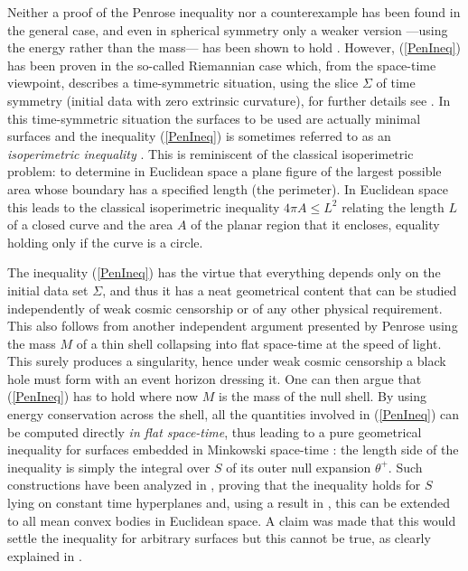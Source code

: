 \documentclass[12pt]{iopart}
\begin{document}
Neither a proof of the Penrose inequality nor a counterexample has been found in the general case, and even in spherical symmetry only a weaker version ---using the energy rather than the mass--- has been shown to hold \cite{Hay1}. However, (\ref{PenIneq}) has been proven in the so-called Riemannian case \cite{Huisken,Bray} which, from the space-time viewpoint, describes a time-symmetric situation, using the slice $\Sigma$ of time symmetry (initial data with zero extrinsic curvature), for further details see \cite{Mars,BrCh}. In this time-symmetric situation the surfaces to be used are actually minimal surfaces and the inequality (\ref{PenIneq}) is sometimes referred to as an {\em isoperimetric inequality} \cite{Gi0,Gi1}. This is reminiscent of the classical isoperimetric problem: to determine in Euclidean space a plane figure of the largest possible area whose boundary has a specified length (the perimeter). In Euclidean space this leads to the classical isoperimetric inequality $4\pi A \le L^2$ relating the length $L$ of a closed curve and the area $A$ of the planar region that it encloses, equality holding only if the curve is a circle. 


The inequality (\ref{PenIneq}) has the virtue that everything depends only on the initial data set $\Sigma$, and thus it has a neat geometrical content that can be studied independently of weak cosmic censorship or of any other physical requirement. This also follows from another independent argument presented by Penrose \cite{PI} using the mass $M$ of a thin shell collapsing into flat space-time at the speed of light. This surely produces a singularity, hence under weak cosmic censorship  a black hole must form with an event horizon dressing it. One can then argue that (\ref{PenIneq}) has to hold where now $M$ is the mass of the null shell. By using energy conservation across the shell, all the quantities involved in (\ref{PenIneq}) can be computed directly {\em in flat space-time}, thus leading to a pure geometrical inequality for surfaces embedded in Minkowski space-time \cite{Gi}: the length side of the inequality is simply the integral over $S$ of its outer null expansion $\theta^{+}$. Such constructions have been analyzed in \cite{Gi,PTW,Tod,Tod0}, proving that the inequality holds for $S$ lying on constant time hyperplanes and, using a result in \cite{Tru}, this can be extended to all mean convex bodies in Euclidean space. A claim was made \cite{Gi} that this would settle the inequality for arbitrary surfaces but this cannot be true, as clearly explained in \cite{Mars}.
\end{document}
